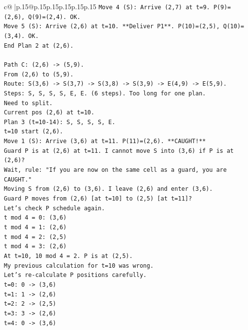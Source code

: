 \documentclass{article}
\begin{document}
{\begin{supertabular}{c@{$\;$}|p{.15\linewidth}@{}p{.15\linewidth}p{.15\linewidth}p{.15\linewidth}p{.15\linewidth}p{.15\linewidth}}
{{{\texttt{Move 4 (S): Arrive (2,7) at t=9. P(9)=(2,6), Q(9)=(2,4). OK.} \\
\texttt{Move 5 (S): Arrive (2,6) at t=10. **Deliver P1**. P(10)=(2,5), Q(10)=(3,4). OK.} \\
\texttt{End Plan 2 at (2,6).} \\
\\ 
\texttt{Path C: (2,6) {-}> (5,9).} \\
\texttt{From (2,6) to (5,9).} \\
\texttt{Route: S(3,6) {-}> S(3,7) {-}> S(3,8) {-}> S(3,9) {-}> E(4,9) {-}> E(5,9).} \\
\texttt{Steps: S, S, S, S, E, E. (6 steps). Too long for one plan.} \\
\texttt{Need to split.} \\
\texttt{Current pos (2,6) at t=10.} \\
\texttt{Plan 3 (t=10{-}14): S, S, S, S, E.} \\
\texttt{t=10 start (2,6).} \\
\texttt{Move 1 (S): Arrive (3,6) at t=11. P(11)=(2,6). **CAUGHT!**} \\
\texttt{Guard P is at (2,6) at t=11. I cannot move S into (3,6) if P is at (2,6)?} \\
\texttt{Wait, rule: "If you are now on the same cell as a guard, you are CAUGHT."} \\
\texttt{Moving S from (2,6) to (3,6). I leave (2,6) and enter (3,6).} \\
\texttt{Guard P moves from (2,6) {[}at t=10{]} to (2,5) {[}at t=11{]}?} \\
\texttt{Let's check P schedule again.} \\
\texttt{t mod 4 = 0: (3,6)} \\
\texttt{t mod 4 = 1: (2,6)} \\
\texttt{t mod 4 = 2: (2,5)} \\
\texttt{t mod 4 = 3: (2,6)} \\
\texttt{At t=10, 10 mod 4 = 2. P is at (2,5).} \\
\texttt{My previous calculation for t=10 was wrong.} \\
\texttt{Let's re{-}calculate P positions carefully.} \\
\texttt{t=0: 0 {-}> (3,6)} \\
\texttt{t=1: 1 {-}> (2,6)} \\
\texttt{t=2: 2 {-}> (2,5)} \\
\texttt{t=3: 3 {-}> (2,6)} \\
\texttt{t=4: 0 {-}> (3,6)} \\
}}}
\end{supertabular}}
\end{document}
